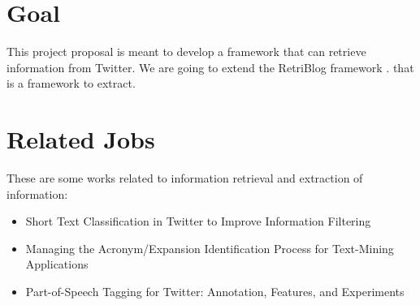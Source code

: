 \documentclass[12pt]{article}
\begin{document}
\section{Goal}
This project proposal is meant to develop a framework that can retrieve information from Twitter. We are going to extend the RetriBlog framework \cite{Ferreira:13}. that is a framework to extract.



\section{Related Jobs}
These are some works related to information retrieval and extraction of information:
\begin{itemize}
\item Short Text Classification in Twitter to Improve Information Filtering \cite{Sriram:10}
\item Managing the Acronym/Expansion Identification Process for Text-Mining Applications \cite{Roche:08} 
\item Part-of-Speech Tagging for Twitter: Annotation, Features, and Experiments \cite{Gimpel:11}
\end{itemize}



\end{document}
